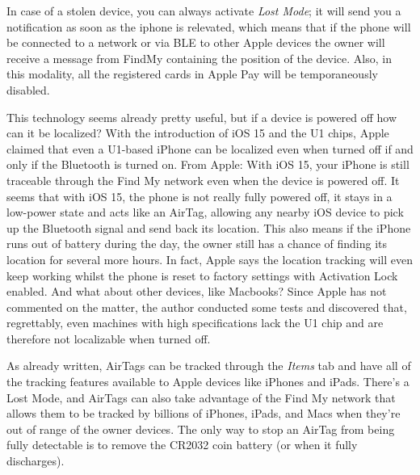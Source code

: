 \documentclass[english]{article}
\begin{document}
In case of a stolen device, you can always activate \textit{Lost Mode}; it will send you a notification as soon as the iphone is relevated, which means that if the phone will be connected to a network or via BLE to other Apple devices the owner will receive a message from FindMy containing the position of the device. Also, in this modality, all the registered cards in Apple Pay will be temporaneously disabled.

This technology seems already pretty useful, but if a device is powered off how can it be localized? With the introduction of iOS 15 and the U1 chips, Apple claimed that even a U1-based iPhone can be localized even when turned off if and only if the Bluetooth is turned on. From Apple: With iOS 15, your iPhone is still traceable through the Find My network even when the device is powered off. 
It seems that with iOS 15, the phone is not really fully powered off, it stays in a low-power state and acts like an AirTag, allowing any nearby iOS device to pick up the Bluetooth signal and send back its location.
This also means if the iPhone runs out of battery during the day, the owner still has a chance of finding its location for several more hours. In fact, Apple says the location tracking will even keep working whilst the phone is reset to factory settings with Activation Lock enabled. And what about other devices, like Macbooks? Since Apple has not commented on the matter, the author conducted some tests and discovered that, regrettably, even machines with high specifications lack the U1 chip and are therefore not localizable when turned off. 

As already written, AirTags can be tracked through the \textit{Items} tab and have all of the tracking features available to Apple devices like iPhones and iPads. There's a Lost Mode, and AirTags can also take advantage of the Find My network that allows them to be tracked by billions of iPhones, iPads, and Macs when they're out of range of the owner devices. The only way to stop an AirTag from being fully detectable is to remove the CR2032 coin battery (or when it fully discharges).
\end{document}
